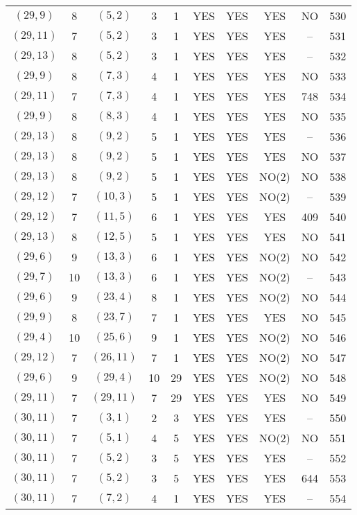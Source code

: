 \begin{longtable}{|c|c|c|c|c|c|c|c|c|c|}
$(29, 9)$ & 8 & $(5, 2)$ & 3 & 1 & YES & YES & YES & NO & 530\\
$(29, 11)$ & 7 & $(5, 2)$ & 3 & 1 & YES & YES & YES & -- & 531\\
$(29, 13)$ & 8 & $(5, 2)$ & 3 & 1 & YES & YES & YES & -- & 532\\
$(29, 9)$ & 8 & $(7, 3)$ & 4 & 1 & YES & YES & YES & NO & 533\\
$(29, 11)$ & 7 & $(7, 3)$ & 4 & 1 & YES & YES & YES & 748 & 534\\
$(29, 9)$ & 8 & $(8, 3)$ & 4 & 1 & YES & YES & YES & NO & 535\\
$(29, 13)$ & 8 & $(9, 2)$ & 5 & 1 & YES & YES & YES & -- & 536\\
$(29, 13)$ & 8 & $(9, 2)$ & 5 & 1 & YES & YES & YES & NO & 537\\
$(29, 13)$ & 8 & $(9, 2)$ & 5 & 1 & YES & YES & NO(2) & NO & 538\\
$(29, 12)$ & 7 & $(10, 3)$ & 5 & 1 & YES & YES & NO(2) & -- & 539\\
$(29, 12)$ & 7 & $(11, 5)$ & 6 & 1 & YES & YES & YES & 409 & 540\\
$(29, 13)$ & 8 & $(12, 5)$ & 5 & 1 & YES & YES & YES & NO & 541\\
$(29, 6)$ & 9 & $(13, 3)$ & 6 & 1 & YES & YES & NO(2) & NO & 542\\
$(29, 7)$ & 10 & $(13, 3)$ & 6 & 1 & YES & YES & NO(2) & -- & 543\\
$(29, 6)$ & 9 & $(23, 4)$ & 8 & 1 & YES & YES & NO(2) & NO & 544\\
$(29, 9)$ & 8 & $(23, 7)$ & 7 & 1 & YES & YES & YES & NO & 545\\
$(29, 4)$ & 10 & $(25, 6)$ & 9 & 1 & YES & YES & NO(2) & NO & 546\\
$(29, 12)$ & 7 & $(26, 11)$ & 7 & 1 & YES & YES & NO(2) & NO & 547\\
$(29, 6)$ & 9 & $(29, 4)$ & 10 & 29 & YES & YES & NO(2) & NO & 548\\
$(29, 11)$ & 7 & $(29, 11)$ & 7 & 29 & YES & YES & YES & NO & 549\\
$(30, 11)$ & 7 & $(3, 1)$ & 2 & 3 & YES & YES & YES & -- & 550\\
$(30, 11)$ & 7 & $(5, 1)$ & 4 & 5 & YES & YES & NO(2) & NO & 551\\
$(30, 11)$ & 7 & $(5, 2)$ & 3 & 5 & YES & YES & YES & -- & 552\\
$(30, 11)$ & 7 & $(5, 2)$ & 3 & 5 & YES & YES & YES & 644 & 553\\
$(30, 11)$ & 7 & $(7, 2)$ & 4 & 1 & YES & YES & YES & -- & 554\\

\end{longtable}
